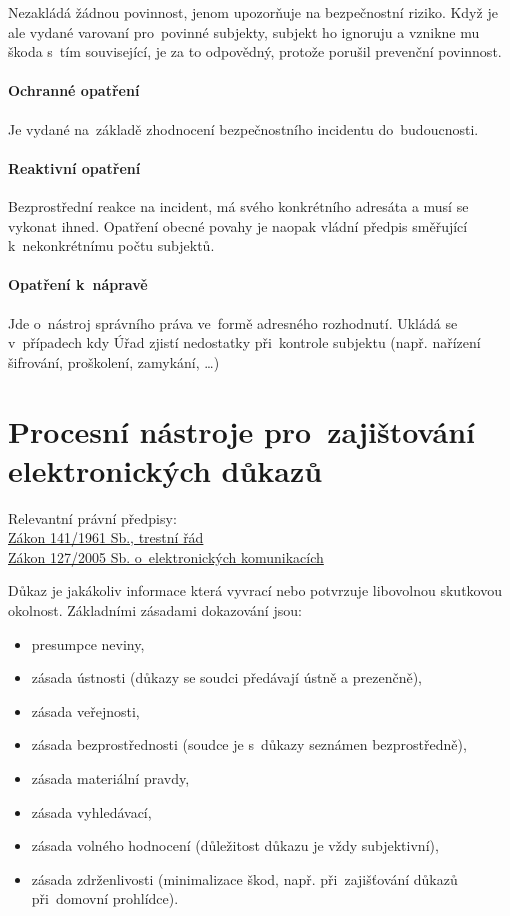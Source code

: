 Nezakládá žádnou povinnost, jenom upozorňuje na bezpečnostní riziko.
Když je ale vydané varovaní pro~povinné subjekty, subjekt ho ignoruju a vznikne mu škoda s~tím související, je za to odpovědný, protože porušil prevenční povinnost.

\paragraph{Ochranné opatření}

Je vydané na~základě zhodnocení bezpečnostního incidentu do~budoucnosti.

\paragraph{Reaktivní opatření}

Bezprostřední reakce na incident, má svého konkrétního adresáta a musí se vykonat ihned.
Opatření obecné povahy je naopak vládní předpis směřující k~nekonkrétnímu počtu subjektů.

\paragraph{Opatření k~nápravě}

Jde o~nástroj správního práva ve~formě adresného rozhodnutí.
Ukládá se v~případech kdy Úřad zjistí nedostatky při~kontrole subjektu (např. nařízení šifrování, proškolení, zamykání, \dots)


\clearpage
\section{Procesní nástroje pro~zajištování elektronických důkazů}

{}Relevantní právní předpisy:
\\\href{https://www.zakonyprolidi.cz/cs/1961-141}{Zákon 141/1961 Sb., trestní řád}
\\\href{https://www.zakonyprolidi.cz/cs/2005-127}{Zákon 127/2005 Sb. o~elektronických komunikacích}

Důkaz je jakákoliv informace která vyvrací nebo potvrzuje libovolnou skutkovou okolnost.
Základními zásadami dokazování jsou:
\vspace*{-1em}\begin{itemize}
\item presumpce neviny,
\item zásada ústnosti (důkazy se soudci předávají ústně a prezenčně),
\item zásada veřejnosti,
\item zásada bezprostřednosti (soudce je s~důkazy seznámen bezprostředně),
\item zásada materiální pravdy,
\item zásada vyhledávací,
\item zásada volného hodnocení (důležitost důkazu je vždy subjektivní),
\item zásada zdrženlivosti (minimalizace škod, např. při~zajišťování důkazů při~domovní prohlídce).
\end{itemize}

